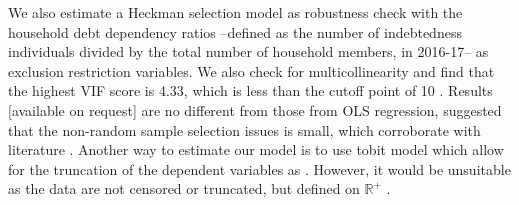 \documentclass[a4paper, 11pt, onecolumn]{article}
\newcommand{\PTCS}{PT\&CS}
\begin{document}
We also estimate a Heckman selection model as robustness check with the household debt dependency ratios --defined as the number of indebtedness individuals divided by the total number of household members, in 2016-17-- as exclusion restriction variables.
We also check for multicollinearity and find that the highest VIF score is 4.33, which is less than the cutoff point of 10 \citep{Lennox2011}.
Results [available on request] are no different from those from OLS regression, suggested that the non-random sample selection issues is small, which corroborate with literature \citep{Rio2006, Brown2014}.
Another way to estimate our model is to use tobit model which allow for the truncation of the dependent variables as \cite{Brown2014, Cox1993}.
However, it would be unsuitable as the data are not censored or truncated, but defined on $\mathbb{R}^{+}$ \citep{Maddala1991}.


\end{document}
